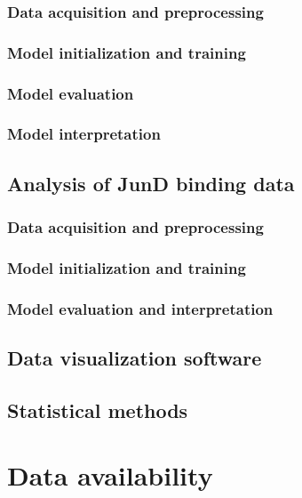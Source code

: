 \subsubsection{Data acquisition and preprocessing}

\subsubsection{Model initialization and training}

\subsubsection{Model evaluation}

\subsubsection{Model interpretation}

\subsection{Analysis of JunD binding data}

\subsubsection{Data acquisition and preprocessing}

\subsubsection{Model initialization and training}

\subsubsection{Model evaluation and interpretation}

\subsection{Data visualization software}

\subsection{Statistical methods}

\section{Data availability}

